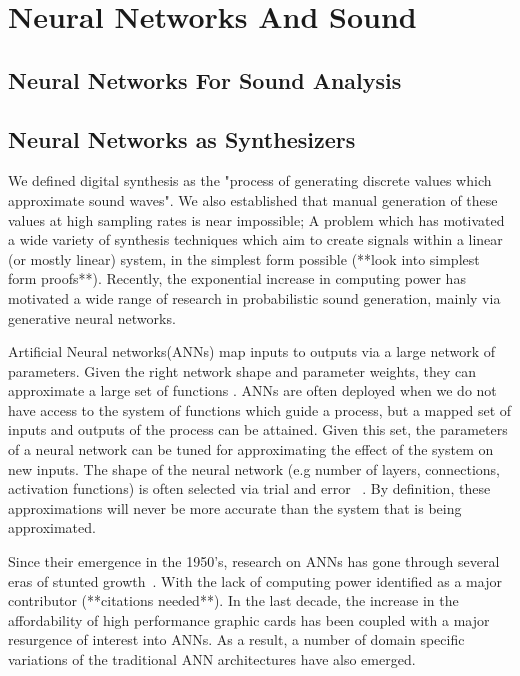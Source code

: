 \documentclass[\main/thesis.tex]{subfiles}
\begin{document}
\section{Neural Networks And Sound}
\label{bg:NN}
\subsection{Neural Networks For Sound Analysis}
\subsection{Neural Networks as Synthesizers}
We defined digital synthesis as the "process of generating discrete values which approximate sound waves". We also established that manual generation of these values at high sampling rates is near impossible; A problem which has motivated a wide variety of synthesis techniques which aim to create signals within a linear (or mostly linear) system, in the simplest form possible (**look into simplest form proofs**). Recently, the exponential increase in computing power has motivated a wide range of research in probabilistic sound generation, mainly via generative neural networks. 

Artificial Neural networks(ANNs) map inputs to outputs via a large network of parameters. Given the right network shape and parameter weights, they can approximate a large set of functions \cite{cybenko1989approximation,cardaliaguet1992approximation}. ANNs are often deployed when we do not have access to the system of functions which guide a process, but a mapped set of inputs and outputs of the process can be attained. Given this set, the parameters of a neural network can be tuned for approximating the effect of the system on new inputs. The shape of the neural network (e.g number of layers, connections, activation functions) is often selected via trial and error ~\cite{bergstra2012random,bergstra2011algorithms,ba2013adaptive}. By definition, these approximations will never be more accurate than the system that is being approximated. 

Since their emergence in the 1950's, research on ANNs has gone through several eras of stunted growth~\cite{basheer2000artificial,anderson1988neurocomputing}. With the lack of computing power identified as a major contributor (**citations needed**). In the last decade, the increase in the affordability of high performance graphic cards has been coupled with a major resurgence of interest into ANNs. As a result, a number of domain specific variations of the traditional ANN architectures have also emerged. 
\end{document}
